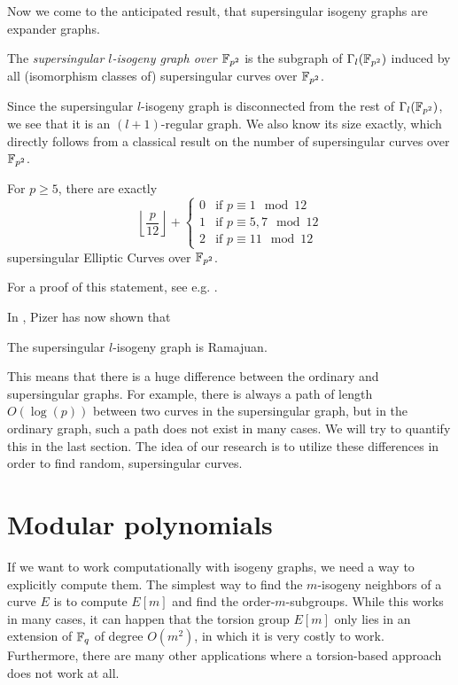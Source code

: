 Now we come to the anticipated result, that supersingular isogeny graphs are expander graphs.
\begin{definition}
    The \emph{supersingular $l$-isogeny graph over $\mathbb{F}_{p^2}$} is the subgraph of $\Gamma_l(\mathbb{F}_{p^2})$ induced by all (isomorphism classes of) supersingular curves over $\mathbb{F}_{p^2}$.
\end{definition}
Since the supersingular $l$-isogeny graph is disconnected from the rest of $\Gamma_l(\mathbb{F}_{p^2})$, we see that it is an $(l + 1)$-regular graph.
We also know its size exactly, which directly follows from a classical result on the number of supersingular curves over $\mathbb{F}_{p^2}$.
\begin{prop}
    For $p \geq 5$, there are exactly
    \begin{equation*}
        \left\lfloor \frac p {12} \right\rfloor + \begin{cases}
            0 & \text{if $p \equiv 1 \mod 12$} \\
            1 & \text{if $p \equiv 5, 7 \mod 12$} \\
            2 & \text{if $p \equiv 11 \mod 12$}
        \end{cases}
    \end{equation*}
    supersingular Elliptic Curves over $\mathbb{F}_{p^2}$.
\end{prop}
For a proof of this statement, see e.g. \cite[Thm~V.4.1]{arithmetic_elliptic_curves}.

In \cite{supersingular_graphs_ramajuan}, Pizer has now shown that
\begin{theorem}
    \label{prop:supersingular_graph_ramajuan}
    The supersingular $l$-isogeny graph is Ramajuan.
\end{theorem}
This means that there is a huge difference between the ordinary and supersingular graphs.
For example, there is always a path of length $O(\log(p))$ between two curves in the supersingular graph, but in the ordinary graph, such a path does not exist in many cases.
We will try to quantify this in the last section.
The idea of our research is to utilize these differences in order to find random, supersingular curves.

\section{Modular polynomials}
If we want to work computationally with isogeny graphs, we need a way to explicitly compute them.
The simplest way to find the $m$-isogeny neighbors of a curve $E$ is to compute $E[m]$ and find the order-$m$-subgroups.
While this works in many cases, it can happen that the torsion group $E[m]$ only lies in an extension of $\mathbb{F}_q$ of degree $O(m^2)$, in which it is very costly to work.
Furthermore, there are many other applications where a torsion-based approach does not work at all.

